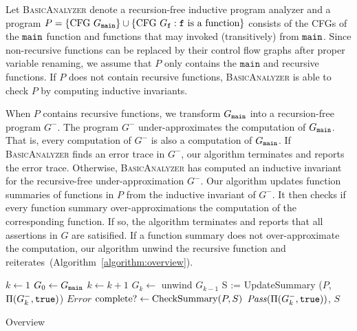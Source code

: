 
Let \textsc{BasicAnalyzer} denote a recursion-free inductive program
analyzer and a program $P=\{\mbox{CFG }G_{\mathtt{{main}}}\}\cup\{\mbox{CFG } G_{\mathtt{{f}}} : \mathtt{{f}}\mbox{ is a function}\}$ consists of the CFGs of the $\mathtt{{main}}$ function and functions that may invoked (transitively) from $\mathtt{{main}}$.
Since non-recursive functions can be replaced by their control flow graphs
after proper variable renaming, we assume that $P$ only contains the
$\mathtt{main}$ and recursive functions. If $P$ does not contain
recursive functions, \textsc{BasicAnalyzer} is able to check $P$ by
computing inductive invariants.

When $P$ contains recursive functions, we transform $G_{\mathtt{{main}}}$ into a
recursion-free program $G^-$. The program $G^-$
under-approximates the computation of $G_{\mathtt{{main}}}$. That is, every computation
of $G^-$ is also a computation of $G_{\mathtt{{main}}}$. If
\textsc{BasicAnalyzer} finds an error trace in $G^-$, our
algorithm terminates and reports the error trace. Otherwise,
\textsc{BasicAnalyzer} has computed an inductive invariant for the
recursive-free under-approximation $G^-$. Our algorithm
updates function summaries of functions in $P$ from the inductive invariant of
$G^-$. It then checks if every function summary
over-approximations the computation of the corresponding function. If
so, the algorithm terminates and reports that all assertions in $G$
are satisified. If a function summary does not over-approximate the
computation, our algorithm unwind the recursive function and
reiterates~(Algorithm~\ref{algorithm:overview}).

\begin{algorithm}

  $k \leftarrow 1$\;
  $G_0 \leftarrow G_{\mathtt{{main}}}$\;
  {
    $k \leftarrow k + 1$\;
    $G_{k} \leftarrow $ unwind $G_{k-1}$\;
    {
      {    
        S := UpdateSummary ($P$, $\Pi (G^-_k, \mathtt{true})$)\;
      }
      {
        \Return $\mathit{Error}$\;
      }
    }
    $\textmd{complete?} \leftarrow \textmd{CheckSummary} (P, S)$\;
  }
  \Return $\mathit{Pass} (\Pi (G^-_k, \mathtt{true}))$, $S$\;
  \caption{Overview}
  \label{algorithm:overview}
\end{algorithm}

